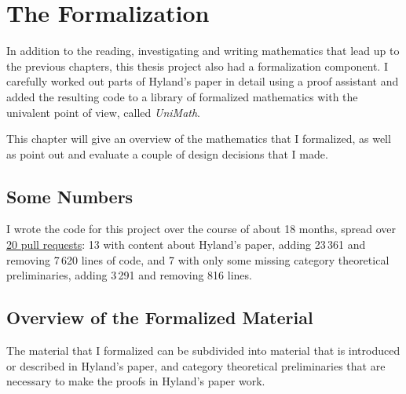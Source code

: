 \chapter{The Formalization}\label{ch:the-formalization}

In addition to the reading, investigating and writing mathematics that lead up to the previous chapters, this thesis project also had a formalization component. I carefully worked out parts of Hyland's paper in detail using a proof assistant and added the resulting code to a library of formalized mathematics with the univalent point of view, called \textit{UniMath}.

This chapter will give an overview of the mathematics that I formalized, as well as point out and evaluate a couple of design decisions that I made.


\section{Some Numbers}
I wrote the code for this project over the course of about 18 months, spread over \href{https://github.com/UniMath/UniMath/pulls?q=is%3Apr+author%3Aarnoudvanderleer+is%3Aclosed}{20 pull requests}: 13 with content about Hyland's paper, adding 23\,361 and removing 7\,620 lines of code, and 7 with only some missing category theoretical preliminaries, adding 3\,291 and removing 816 lines.

\section{Overview of the Formalized Material}
The material that I formalized can be subdivided into material that is introduced or described in Hyland's paper, and category theoretical preliminaries that are necessary to make the proofs in Hyland's paper work.


